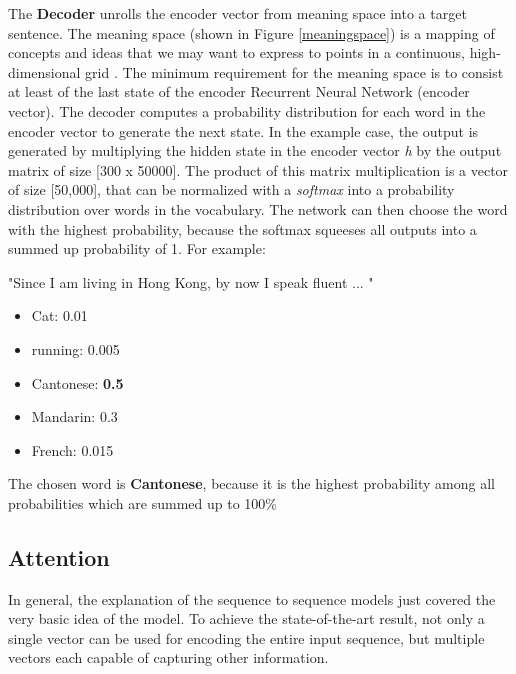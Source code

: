 The \textbf{Decoder} unrolls the encoder vector from meaning space into a target sentence. The meaning space (shown in Figure \ref{meaningspace}) is a mapping of concepts and ideas that we may want to express to points in a continuous, high-dimensional grid \cite{mugan}. 
The minimum requirement for the meaning space is to consist at least of the last state of the encoder Recurrent Neural Network (encoder vector). The decoder computes a probability distribution for each word in the encoder vector to generate the next state. In the example case, the output is generated by multiplying the hidden state in the encoder vector \textit{h} by the output matrix of size [300 x 50000]. The product of this matrix multiplication is a vector of size [50,000], that can be normalized with a \textit{softmax} into a probability distribution over words in the vocabulary. The network can then choose the word with the highest probability, because the softmax squeeses all outputs into a summed up probability of 1. For example:

\begin{tcolorbox}
	"Since I am living in Hong Kong, by now I speak fluent ... "
	
	\begin{itemize}
		\item Cat: 0.01
		\item running: 0.005
		\item Cantonese: \textbf{0.5}
		\item Mandarin: 0.3
		\item French: 0.015
	\end{itemize}

	The chosen word is \textbf{Cantonese}, because it is the highest probability among all probabilities which are summed up to 100\%
\end{tcolorbox}
 

\subsection{Attention}
In general, the explanation of the sequence to sequence models just covered the very basic idea of the model. To achieve the state-of-the-art result, not only a single vector can be used for encoding the entire input sequence, but multiple vectors each capable of capturing other information. 

